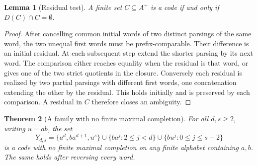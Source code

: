 \documentclass[11pt,a4paper]{article}
\newtheorem{theorem}{Theorem}
\newtheorem{lemma}[theorem]{Lemma}
\begin{document}
\begin{lemma}[Residual test]\label{lem:residual}
A finite set $C\subseteq A^+$ is a code if and only if $D(C)\cap C=\emptyset$.
\end{lemma}

\begin{proof}
After cancelling common initial words of two distinct parsings of the same word, the two unequal
first words must be prefix-comparable. Their difference is an initial residual. At each subsequent
step extend the shorter parsing by its next word. The comparison either reaches equality when the
residual is that word, or gives one of the two strict quotients in the closure. Conversely each
residual is realized by two partial parsings with different first words, one concatenation
extending the other by the residual. This holds initially and is preserved by each comparison. A
residual in $C$ therefore closes an ambiguity.
\end{proof}

\begin{theorem}[A family with no finite maximal completion]\label{thm:family}
For all $d,s\ge2$, writing $u=ab$, the set
\[
  Y_{d,s}=\{a^d,ba^{d+1},u^s\}\cup\{ba^j:2\le j<d\}\cup\{bu^j:0\le j\le s-2\}
\]
is a code with no finite maximal completion on any finite alphabet containing $a,b$. The same
holds after reversing every word.
\end{theorem}
\end{document}
